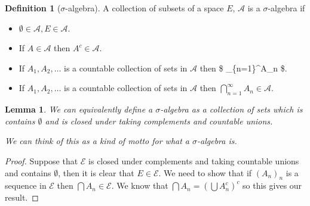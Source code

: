 \documentclass[
]{book}
\providecommand{\tightlist}{%
  \setlength{\itemsep}{0pt}\setlength{\parskip}{0pt}}
\newtheorem{lemma}{Lemma}[chapter]
\theoremstyle{definition}
\newtheorem{definition}{Definition}[chapter]
\theoremstyle{definition}
\theoremstyle{definition}
\theoremstyle{definition}
\theoremstyle{remark}
\begin{document}
\begin{definition}[$\sigma$-algebra]

A collection of subsets of a space \(E\), \(\mathcal{A}\) is a \(\sigma\)-algebra if

\begin{itemize}
\tightlist
\item
  \(\emptyset \in \mathcal{A}, E \in \mathcal{A}\).
\item
  If \(A \in \mathcal{A}\) then \(A^c \in \mathcal{A}\).
\item
  If \(A_1, A_2, \dots\) is a countable collection of sets in \(\mathcal{A}\) then \$ \bigcup\_\{n=1\}\^{}\infty A\_n \in {}\$.
\item
  If \(A_1, A_2, \dots\) is a countable collection of sets in \(\mathcal{A}\) then \(\bigcap_{n=1}^\infty A_n \in \mathcal{A}\).
\end{itemize}

\end{definition}

\begin{lemma}
We can equivalently define a \(\sigma\)-algebra as a collection of sets which is contains \(\emptyset\) and is closed under taking complements and countable unions.

We can think of this as a kind of \emph{motto} for what a \(\sigma\)-algebra is.
\end{lemma}

\begin{proof}
Suppose that \(\mathcal{E}\) is closed under complements and taking countable unions and contains \(\emptyset\), then it is clear that \(E \in \mathcal{E}\). We need to show that if \((A_n)_n\) is a sequence in \(\mathcal{E}\) then \(\bigcap A_n \in \mathcal{E}\). We know that \(\bigcap A_n = \left( \bigcup A_n^c \right)^c\) so this gives our result.
\end{proof}
\end{document}

